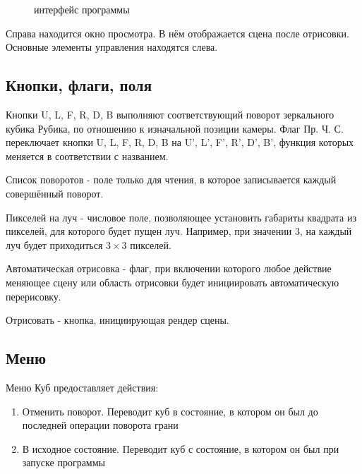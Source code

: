 \documentclass[a4paper, 14pt]{report} %
\begin{document}
	\begin{figure}[ht]
		\caption{интерфейс программы}
		\label{fig:interface}
	\end{figure}

	Справа находится окно просмотра. В нём отображается сцена после отрисовки. Основные элементы управления находятся слева.
	
	\subsection{Кнопки, флаги, поля}
	Кнопки U, L, F, R, D, B выполняют соответствующий поворот зеркального кубика Рубика, по отношению к изначальной позиции камеры. Флаг Пр. Ч. С. переключает кнопки U, L, F, R, D, B на U', L', F', R', D', B', функция которых меняется в соответствии с названием.
	
	Список поворотов - поле только для чтения, в которое записывается каждый совершённый поворот.
	
	Пикселей на луч - числовое поле, позволяющее установить габариты квадрата из пикселей, для которого будет пущен луч. Например, при значении 3, на каждый луч будет приходиться $3\times 3$ пикселей.
	
	Автоматическая отрисовка - флаг, при включении которого любое действие меняющее сцену или область отрисовки будет инициировать автоматическую перерисовку.
	
	Отрисовать - кнопка, инициирующая рендер сцены.
	
	\subsection{Меню}
	Меню Куб предоставляет действия:
	\begin{enumerate}
	\item Отменить поворот. Переводит куб в состояние, в котором он был до последней операции поворота грани
	\item В исходное состояние. Переводит куб с состояние, в котором он был при запуске программы
	\end{enumerate}
\end{document}
